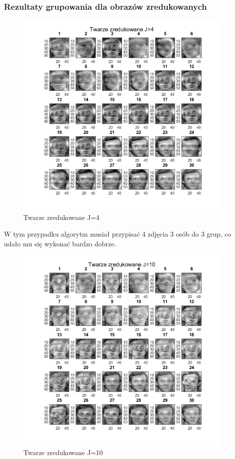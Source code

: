 \documentclass[11pt, a4paper]{article}
\newcommand{\fbi}{\leavevmode{\parindent=1em\indent}}
\begin{document}
\subsubsection{Rezultaty grupowania dla obrazów zredukowanych}


\begin{figure}[H]
	\centering
	\includegraphics[width=0.95\textwidth]{./assets/ilustracja_zad2_redukcja_j4.png}
	\caption{Twarze zredukowane J=4}
	\label{fig:ilustracja_zad2_redukcja_j4}
\end{figure}

\fbi
W tym przypadku algorytm musiał przypisać 4 zdjęcia 3 osób do 3 grup, co udało mu się wykonać bardzo dobrze. 


\begin{figure}[H]
	\centering
	\includegraphics[width=0.95\textwidth]{./assets/ilustracja_zad2_redukcja_j10.png}
	\caption{Twarze zredukowane J=10}
	\label{fig:ilustracja_zad2_redukcja_j10}
\end{figure}
\end{document}
